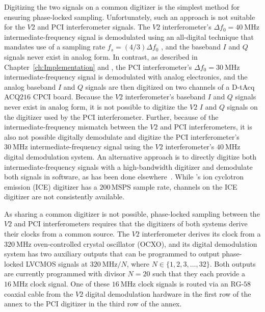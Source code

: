 Digitizing the two signals on a common digitizer
is the simplest method for ensuring phase-locked sampling.
Unfortunately, such an approach is not suitable
for the $V2$ and PCI interferometer signals.
The $V2$ interferometer's
$\Delta f_0 = \SI{40}{\mega\hertz}$ intermediate-frequency signal
is demodulated using an all-digital technique
that mandates use of a sampling rate
$f_s = (4 / 3) \Delta f_0$
\cite{vanzeeland_rsi08}, and
the baseband $I$ and $Q$ signals never exist in analog form.
In contrast, as described in
Chapter~\ref{ch:Implementation} and \cite{davis_rsi16},
the PCI interferometer's
$\Delta f_0 = \SI{30}{\mega\hertz}$ intermediate-frequency signal
is demodulated with analog electronics, and
the analog baseband $I$ and $Q$ signals
are then digitized on two channels of a D-tAcq ACQ$216$ CPCI board.
Because the $V2$ interferometer's baseband $I$ and $Q$ signals
never exist in analog form,
it is not possible to digitize the $V2$ $I$ and $Q$ signals
on the digitizer used by the PCI interferometer.
Further, because of the intermediate-frequency mismatch
between the $V2$ and PCI interferometers,
it is also not possible digitally demodulate and digitize
the PCI interferometer's $\SI{30}{\mega\hertz}$ intermediate-frequency signal
using the $V2$ interferometer's
$\SI{40}{\mega\hertz}$ digital demodulation system.
An alternative approach is to directly digitize
both intermediate-frequency signals
with a high-bandwidth digitizer and
demodulate both signals in software,
as has been done elsewhere~\cite{mlynek_fst12}.
While \diiid's ion cyclotron emission (ICE) digitizer
has a $200 \, \text{MSPS}$ sample rate,
channels on the ICE digitizer are not consistently available.

As sharing a common digitizer is not possible,
phase-locked sampling between the $V2$ and PCI interferometers
requires that the digitizers of both systems
derive their clocks from a common source.
The $V2$ interferometer derives its clock
from a $\SI{320}{\mega\hertz}$ oven-controlled crystal oscillator (OCXO), and
its digital demodulation system
has two auxiliary outputs that can be programmed
to output phase-locked LVCMOS signals
at $\SI{320}{\mega\hertz} / N$, where
$N \in \{1, 2, 3, ..., 32\}$.
Both outputs are currently programmed with divisor $N = 20$
such that they each provide a $\SI{16}{\mega\hertz}$ clock signal.
One of these $\SI{16}{\mega\hertz}$ clock signals
is routed via an RG-$58$ coaxial cable
from the $V2$ digital demodulation hardware
in the first row of the \diiid\space annex
to the PCI digitizer
in the third row of the \diiid\space annex.


